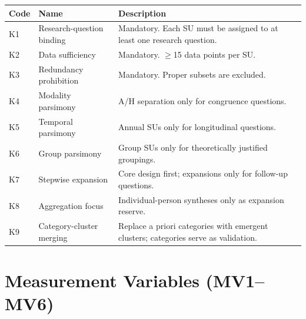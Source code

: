 \documentclass[11pt,a4paper]{article}
\theoremstyle{definition}
\theoremstyle{plain}
\theoremstyle{remark}
\begin{document}
\begin{longtable}{l p{3cm} p{8cm}}
  \toprule
  \textbf{Code} & \textbf{Name} & \textbf{Description} \\
  \midrule
  \endhead
  K1 & Research-question binding & Mandatory. Each SU must be assigned to at least one research question. \\
  K2 & Data sufficiency & Mandatory. $\geq$15 data points per SU. \\
  K3 & Redundancy prohibition & Mandatory. Proper subsets are excluded. \\
  K4 & Modality parsimony & A/H separation only for congruence questions. \\
  K5 & Temporal parsimony & Annual SUs only for longitudinal questions. \\
  K6 & Group parsimony & Group SUs only for theoretically justified groupings. \\
  K7 & Stepwise expansion & Core design first; expansions only for follow-up questions. \\
  K8 & Aggregation focus & Individual-person syntheses only as expansion reserve. \\
  K9 & Category-cluster merging & Replace a priori categories with emergent clusters; categories serve as validation. \\
  \bottomrule
\end{longtable}


\section{Measurement Variables (MV1--MV6)}
\label{app:messvariablen}
\end{document}
